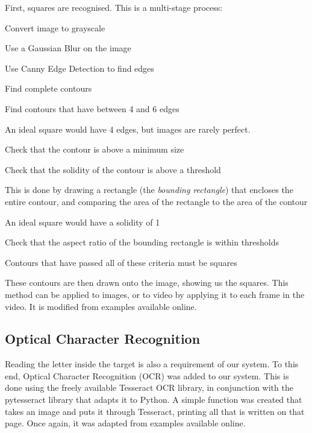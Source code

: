\documentclass[11pt,twoside]{article}
\begin{document}
First, squares are recognised. This is a multi-stage process:
\begin{compactenum}
    \item Convert image to grayscale
    \item Use a Gaussian Blur on the image
    \item Use Canny Edge Detection to find edges
    \item Find complete contours
    \item Find contours that have between 4 and 6 edges
    \begin{compactitem}
        \item An ideal square would have 4 edges, but images are rarely perfect.
    \end{compactitem}
    \item Check that the contour is above a minimum size
    \item Check that the solidity of the contour is above a threshold
    \begin{compactitem}
        \item This is done by drawing a rectangle (the \emph{bounding rectangle}) that encloses the entire contour, and comparing the area of the rectangle to the area of the contour
        \item An ideal square would have a solidity of 1
    \end{compactitem}
    \item Check that the aspect ratio of the bounding rectangle is within thresholds
    \item Contours that have passed all of these criteria must be squares
\end{compactenum}
These contours are then drawn onto the image, showing us the squares. This method can be applied to images, or to video by applying it to each frame in the video. It is modified from examples available online\cite{opencv_tutorials}\cite{pyimagesearch_squares}.

\subsection{Optical Character Recognition}
Reading the letter inside the target is also a requirement of our system. To this end, Optical Character Recognition (OCR) was added to our system. This is done using the freely available Tesseract OCR library, in conjunction with the pytesseract library that adapts it to Python. A simple function was created that takes an image and puts it through Tesseract, printing all that is written on that page. Once again, it was adapted from examples available online\cite{pyimagesearch_ocr}.
\end{document}
